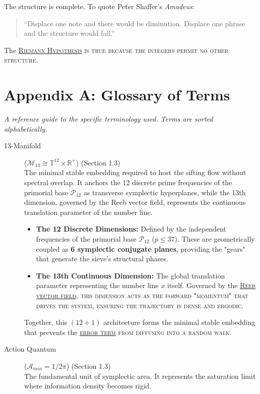 \documentclass[sn-mathphys-num, pdflatex]{sn-jnl}
\newcommand{\gterm}[2]{\begingroup\normalfont\scshape\hyperlink{#1}{#2}\endgroup}
\begin{document}
The structure is complete. To quote Peter Shaffer's \textit{Amadeus}:
\begin{quote}
``Displace one note and there would be diminution. Displace one phrase and the structure would fall.''
\end{quote}
The \gterm{rh}{Riemann Hypothesis} is true because the integers permit no other structure.
\section*{Appendix A: Glossary of Terms}
\textit{A reference guide to the specific terminology used. Terms are sorted alphabetically.}

\begin{description}
    \item[13-Manifold] \hypertarget{m13}{}\label{gloss:13manifold} ($\mathcal{M}_{13} \cong \mathbb{T}^{12} \times \mathbb{R}^+$) (Section 1.3) \hfill \\
    The minimal stable embedding required to host the sifting flow without spectral overlap. It anchors the 12 discrete prime frequencies of the primorial base $\mathcal{P}_{12}$ as transverse symplectic hyperplanes, while the 13th dimension, governed by the Reeb vector field, represents the continuous translation parameter of the number line.
\begin{itemize}
    \item \textbf{The 12 Discrete Dimensions:} Defined by the independent frequencies of the primorial base $\mathcal{P}_{12}$ ($p \le 37$). These are geometrically coupled as \textbf{6 symplectic conjugate planes}, providing the "gears" that generate the sieve's structural phases.
    \item \textbf{The 13th Continuous Dimension:} The global translation parameter representing the number line $x$ itself. Governed by the \gterm{reeb}{Reeb vector field}, this dimension acts as the forward "momentum" that drives the system, ensuring the trajectory is dense and ergodic.
\end{itemize}
Together, this $(12+1)$ architecture forms the minimal stable embedding that prevents the \gterm{error_term}{error term} from diffusing into a random walk.

    \item[Action Quantum] \hypertarget{action_quantum}{}\label{gloss:action} ($\mathcal{A}_{min} = 1/2\pi$) (Section 1.3) \hfill \\
    The fundamental unit of symplectic area. It represents the saturation limit where information density becomes rigid.


\end{description}
\end{document}
